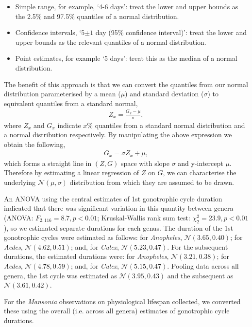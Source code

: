 \documentclass[12pt]{article}
\begin{document}
{\begin{itemize}
	\item Simple range, for example, `4-6 days': treat the lower and upper bounds as the 2.5\% and 97.5\% quantiles of a normal distribution.
	\item Confidence intervals, `5$\pm 1$ day (95\% confidence interval)': treat the lower and upper bounds as the relevant quantiles of a normal distribution.
	\item Point estimates, for example `5 days': treat this as the median of a normal distribution.
\end{itemize}

The benefit of this approach is that we can convert the quantiles from our normal distribution parameterised by a mean ($\mu$) and standard deviation ($\sigma$) to equivalent quantiles from a standard normal,
%
\begin{align}
Z_{x} = \frac{G_{x} - \mu}{\sigma},
\end{align}
%
where $Z_{x}$ and $G_{x}$ indicate $x$\% quantiles from a standard normal distribution and a normal distribution respectively. By manipulating the above expression we obtain the following,
%
\begin{align}
G_{x} = \sigma Z_{x} + \mu,
\end{align}
%
which forms a straight line in $(Z,G)$ space with slope $\sigma$ and y-intercept $\mu$. Therefore by estimating a linear regression of $Z$ on $G$, we can characterise the underlying $\mathcal{N}(\mu,\sigma)$ distribution from which they are assumed to be drawn.

An ANOVA using the central estimates of 1st gonotrophic cycle duration indicated that there was significant variation in this quantity between genera (ANOVA: $F_{2,116}=8.7,p<0.01$; Kruskal-Wallis rank sum test: $\chi^2_2=23.9,p<0.01$), so we estimated separate durations for each genus. The duration of the 1st gonotrophic cycles were estimated as follows: for \textit{Anopheles}, $\mathcal{N}(3.65, 0.40)$; for \textit{Aedes}, $\mathcal{N}(4.62, 0.51)$; and, for \textit{Culex}, $\mathcal{N}(5.23, 0.47)$. For the subsequent durations, the estimated durations were: for \textit{Anopheles}, $\mathcal{N}(3.21, 0.38)$; for \textit{Aedes}, $\mathcal{N}(4.78, 0.59)$; and, for \textit{Culex}, $\mathcal{N}(5.15, 0.47)$. Pooling data across all genera, the 1st cycle was estimated as $\mathcal{N}(3.95, 0.43)$ and the subsequent as $\mathcal{N}(3.61, 0.42)$.

For the \textit{Mansonia} observations on physiological lifespan collected, we converted these using the overall (i.e. across all genera) estimates of gonotrophic cycle durations.

}
\end{document}
